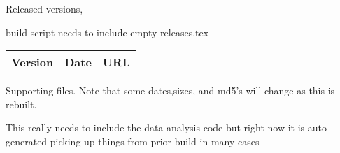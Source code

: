 \documentclass[aps,secnumarabic,balancelastpage,amsmath,amssymb,nofootinbib]{revtex4}
\newcommand{\mjmbasename}{\jobname}
\begin{document}
\begin{mdpicomment}
Released versions,

build script needs to include empty releases.tex
\begin{table}[H] \centering
\begin{tabular}{|r|r|l|}
Version & Date & URL    \\
\hline

\hline
\end{tabular}
\end{table}

\begin{minipage}{\linewidth}
%
%
\mjmshowbib
\end{minipage}

\vspace{1cm}
Supporting files. Note that some dates,sizes, and md5's will change as this is
rebuilt.

This really needs to include the data analysis code 
but right now it is auto generated picking up things from prior
build in many cases 

\end{mdpicomment}
\end{document}
